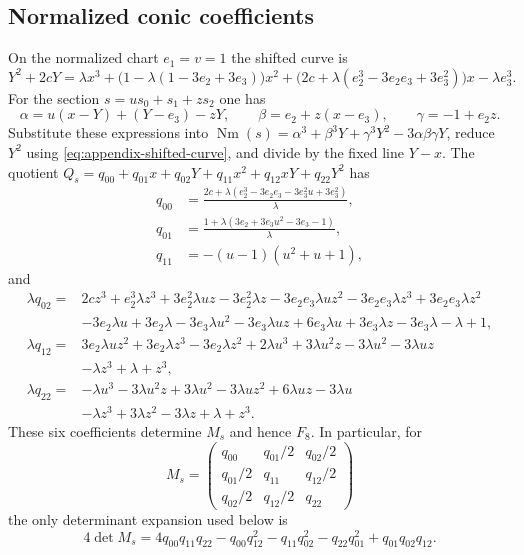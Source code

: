 \documentclass[10pt]{amsart}
\numberwithin{equation}{section}
\theoremstyle{definition}
\theoremstyle{remark}
\begin{document}
\subsection{Normalized conic coefficients}
\label{app:normalized-conic}
On the normalized chart $e_1=v=1$ the shifted curve is
\begin{equation}
 Y^2+2cY
 =\lambda x^3+\bigl(1-\lambda(1-3e_2+3e_3)\bigr)x^2
 +\bigl(2c+\lambda(e_2^3-3e_2e_3+3e_3^2)\bigr)x
 -\lambda e_3^3.
\label{eq:appendix-shifted-curve}
\end{equation}
For the section $s=us_0+s_1+zs_2$ one has
\[
 \alpha=u(x-Y)+(Y-e_3)-zY,\qquad
 \beta=e_2+z(x-e_3),\qquad
 \gamma=-1+e_2z.
\]
Substitute these expressions into
$\operatorname{Nm}(s)=\alpha^3+\beta^3Y+\gamma^3Y^2-3\alpha\beta\gamma Y$,
reduce $Y^2$ using \eqref{eq:appendix-shifted-curve}, and divide by the fixed
line $Y-x$.  The quotient
$Q_s=q_{00}+q_{01}x+q_{02}Y+q_{11}x^2+q_{12}xY+q_{22}Y^2$ has
\begin{align*}
q_{00}&=\frac{2c+\lambda(e_2^3-3e_2e_3-3e_3^2u+3e_3^2)}{\lambda},\\
q_{01}&=\frac{1+\lambda(3e_2+3e_3u^2-3e_3-1)}{\lambda},\\
q_{11}&=-(u-1)(u^2+u+1),
\end{align*}
and
\begin{align*}
\lambda q_{02}={}&2cz^3+e_2^3\lambda z^3+3e_2^2\lambda uz-3e_2^2\lambda z
 -3e_2e_3\lambda uz^2-3e_2e_3\lambda z^3+3e_2e_3\lambda z^2\\
&-3e_2\lambda u+3e_2\lambda-3e_3\lambda u^2-3e_3\lambda uz
 +6e_3\lambda u+3e_3\lambda z-3e_3\lambda-\lambda+1,\\
\lambda q_{12}={}&3e_2\lambda uz^2+3e_2\lambda z^3-3e_2\lambda z^2
 +2\lambda u^3+3\lambda u^2z-3\lambda u^2-3\lambda uz\\
&-\lambda z^3+\lambda+z^3,\\
\lambda q_{22}={}&-\lambda u^3-3\lambda u^2z+3\lambda u^2-3\lambda uz^2
 +6\lambda uz-3\lambda u\\
&-\lambda z^3+3\lambda z^2-3\lambda z+\lambda+z^3.
\end{align*}
These six coefficients determine $M_s$ and hence $F_8$.  In particular, for
\[
 M_s=\begin{pmatrix}
 q_{00}&q_{01}/2&q_{02}/2\\
 q_{01}/2&q_{11}&q_{12}/2\\
 q_{02}/2&q_{12}/2&q_{22}
 \end{pmatrix}
\]
the only determinant expansion used below is
\begin{equation}
 4\det M_s=
 4q_{00}q_{11}q_{22}-q_{00}q_{12}^2-q_{11}q_{02}^2
 -q_{22}q_{01}^2+q_{01}q_{02}q_{12}.
\label{eq:appendix-determinant-expansion}
\end{equation}
\end{document}
